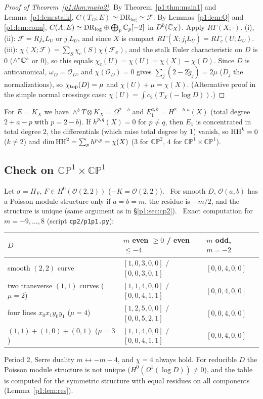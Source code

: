 \begin{proof}[Proof of Theorem~\ref{p1:thm:main2}]
By Theorem~\ref{p1:thm:main1} and Lemma~\ref{p1:lem:stalk}, $C(T_D;E)\simeq\mathrm{DR}_{\log}\simeq\mathcal F$. By Lemmas~\ref{p1:lem:Q} and \ref{p1:lem:conn}, $C(A;E)\simeq\mathrm{DR}_{\log}\oplus\bigoplus_p\mathbb C_p[-2]$ in $D^b(\mathbb C_X)$. Apply $R\Gamma(X;\cdot)$.
(i), (ii): $\mathcal F=Rj_*L_U$ or $j_!L_U$, and since $X$ is compact $R\Gamma(X;j_!L_U)=R\Gamma_c(U;L_U)$.
(iii): $\chi(X;\mathcal F)=\sum_S\chi_c(S)\chi(\mathcal F_x)$, and the stalk Euler characteristic on $D$ is $0$ ($\wedge^*\mathbb C^s$ or $0$), so this equals $\chi_c(U)=\chi(U)=\chi(X)-\chi(D)$. Since $D$ is anticanonical, $\omega_D=\mathcal O_D$, and $\chi(\mathcal O_D)=0$ gives $\sum_j(2-2\tilde g_j)=2\mu$ ($\tilde D_j$ the normalizations), so $\chi_{\rm top}(D)=\mu$ and $\chi(U)+\mu=\chi(X)$. (Alternative proof in the simple normal crossings case: $\chi(U)=\int c_2(T_X(-\log D))$.)
\end{proof}
\begin{prop}[$r_i=1$: $E=K_X$]\tP\label{p1:prop:K}
For $E=K_X$ we have $\wedge^bT\otimes K_X=\Omega^{2-b}$ and $E_1^{a,b}=H^{2-b,a}(X)$ (total degree $2+a-p$ with $p=2-b$). If $h^{p,q}(X)=0$ for $p\ne q$, then $E_1$ is concentrated in total degree $2$, the differentials (which raise total degree by 1) vanish, so $\mathrm{HH}^k=0$ ($k\ne2$) and $\dim\mathrm{HH}^2=\sum_ph^{p,p}=\chi(X)$ ($3$ for $\mathbb{CP}^2$, $4$ for $\mathbb{CP}^1\times\mathbb{CP}^1$).
\end{prop}

\subsection{Check on $\mathbb{CP}^1\times\mathbb{CP}^1$}
Let $\sigma=\Pi_F$, $F\in H^0(\mathcal O(2,2))$ ($-K=\mathcal O(2,2)$). \tP\ For smooth $D$, $\mathcal O(a,b)$ has a Poisson module structure only if $a=b=m$, the residue is $-m/2$, and the structure is unique (same argument as in \S\ref{p1:sec:cp2}). \tV\ Exact computation for $m=-9,\dots,8$ (script \texttt{cp2/p1p1.py}):
\begin{center}\small
\begin{tabular}{lll}\toprule
$D$ & $m$ even $\ge0$ / even $\le-4$ & $m$ odd, $m=-2$\\\midrule
smooth $(2,2)$ curve & $[1,0,3,0,0]$ / $[0,0,3,0,1]$ & $[0,0,4,0,0]$\\
two transverse $(1,1)$ curves ($\mu=2$) & $[1,1,4,0,0]$ / $[0,0,4,1,1]$ & $[0,0,4,0,0]$\\
four lines $x_0x_1y_0y_1$ ($\mu=4$) & $[1,2,5,0,0]$ / $[0,0,5,2,1]$ & $[0,0,4,0,0]$\\
$(1,1)+(1,0)+(0,1)$ ($\mu=3$) & $[1,1,4,0,0]$ / $[0,0,4,1,1]$ & $[0,0,4,0,0]$\\\bottomrule
\end{tabular}
\end{center}
Period 2, Serre duality $m\leftrightarrow-m-4$, and $\chi=4$ always hold. For reducible $D$ the Poisson module structure is not unique ($H^0(\Omega^1(\log D))\ne0$), and the table is computed for the symmetric structure with equal residues on all components (Lemma~\ref{p1:lem:res}).

